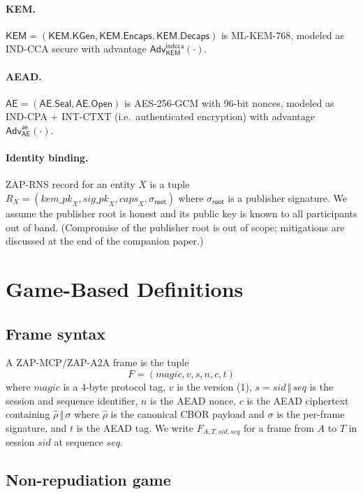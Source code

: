 \documentclass[11pt,a4paper]{article}
\theoremstyle{definition}
\theoremstyle{remark}
\newcommand{\zapmcp}{\textsf{ZAP-MCP}\xspace}
\newcommand{\zapaa}{\textsf{ZAP-A2A}\xspace}
\newcommand{\rns}{\textsf{ZAP-RNS}\xspace}
\newcommand{\Adv}{\mathsf{Adv}}
\newcommand{\AEAD}{\textsf{AE}}
\newcommand{\KEM}{\textsf{KEM}}
\begin{document}
\paragraph{KEM.} $\KEM = (\KEM.\mathsf{KGen}, \KEM.\mathsf{Encaps},
\KEM.\mathsf{Decaps})$ is ML-KEM-768, modeled as IND-CCA secure with
advantage $\Adv^{\mathsf{indcca}}_{\KEM}(\cdot)$.

\paragraph{AEAD.} $\AEAD = (\AEAD.\mathsf{Seal}, \AEAD.\mathsf{Open})$ is
AES-256-GCM with 96-bit nonces, modeled as IND-CPA $+$ INT-CTXT (i.e.\
authenticated encryption) with advantage
$\Adv^{\mathsf{ae}}_{\AEAD}(\cdot)$.

\paragraph{Identity binding.} \rns{} record for an entity $X$ is a
tuple $R_X = (\mathit{kem\_pk}_X, \mathit{sig\_pk}_X, \mathit{caps}_X,
\sigma_{\mathsf{root}})$ where $\sigma_{\mathsf{root}}$ is a publisher
signature. We assume the publisher root is honest and its public key is
known to all participants out of band. (Compromise of the publisher
root is out of scope; mitigations are discussed at the end of the
companion paper.)

\section{Game-Based Definitions}

\subsection{Frame syntax}

A \zapmcp{}/\zapaa{} frame is the tuple
\[
F = (\mathit{magic}, v, s, n, c, t)
\]
where $\mathit{magic}$ is a 4-byte protocol tag, $v$ is the version
(1), $s = \mathit{sid}\,\Vert\,\mathit{seq}$ is the session and
sequence identifier, $n$ is the AEAD nonce, $c$ is the AEAD
ciphertext containing $\hat{\rho}\,\Vert\,\sigma$ where $\hat{\rho}$ is
the canonical CBOR payload and $\sigma$ is the per-frame signature,
and $t$ is the AEAD tag. We write $F_{A,T,\mathit{sid},\mathit{seq}}$
for a frame from $A$ to $T$ in session $\mathit{sid}$ at sequence
$\mathit{seq}$.

\subsection{Non-repudiation game}
\end{document}
